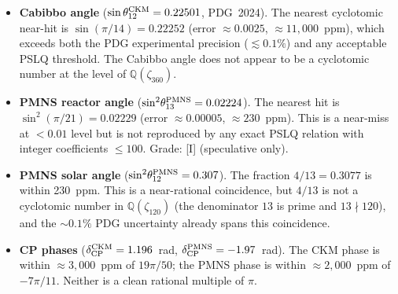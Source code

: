 \begin{itemize}

\item \textbf{Cabibbo angle} ($\sin\theta_{12}^{\rm CKM} = 0.22501$, PDG~2024).
  The nearest cyclotomic near-hit is $\sin(\pi/14) = 0.22252$ (error
  $\approx 0.0025$, $\approx 11{,}000$~ppm), which exceeds both the PDG
  experimental precision ($\lesssim 0.1\%$) and any acceptable PSLQ
  threshold.  The Cabibbo angle does not appear to be a cyclotomic number
  at the level of $\mathbb{Q}(\zeta_{360})$.

\item \textbf{PMNS reactor angle} ($\sin^2\!\theta_{13}^{\rm PMNS} = 0.02224$).
  The nearest hit is $\sin^2(\pi/21) = 0.02229$ (error $\approx
  0.00005$, $\approx 230$~ppm).  This is a near-miss at $< 0.01$ level
  but is not reproduced by any exact PSLQ relation with integer
  coefficients $\leq 100$.  Grade: [I] (speculative only).

\item \textbf{PMNS solar angle} ($\sin^2\!\theta_{12}^{\rm PMNS} = 0.307$).
  The fraction $4/13 = 0.3077$ is within 230~ppm.  This is a
  near-rational coincidence, but $4/13$ is not a cyclotomic number
  in $\mathbb{Q}(\zeta_{120})$ (the denominator $13$ is prime and
  $13 \nmid 120$), and the $\sim 0.1\%$ PDG uncertainty already spans
  this coincidence.

\item \textbf{CP phases} ($\delta_{\rm CP}^{\rm CKM} = 1.196$~rad,
  $\delta_{\rm CP}^{\rm PMNS} = -1.97$~rad).  The CKM phase is within
  $\approx 3{,}000$~ppm of $19\pi/50$; the PMNS phase is within
  $\approx 2{,}000$~ppm of $-7\pi/11$.  Neither is a clean rational
  multiple of $\pi$.

\end{itemize}

